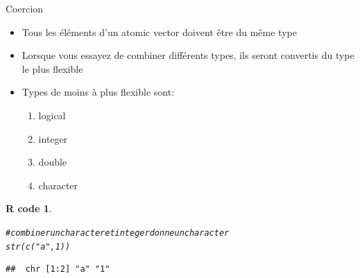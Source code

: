 \documentclass[11pt]{beamer}\usepackage[]{graphicx}\usepackage[]{color}
\makeatletter
\newcommand{\hlnum}[1]{\textcolor[rgb]{0.063,0.58,0.627}{#1}}%
\newcommand{\hlstr}[1]{\textcolor[rgb]{0.063,0.58,0.627}{#1}}%
\newcommand{\hlcom}[1]{\textcolor[rgb]{0.588,0.588,0.588}{#1}}%
\newcommand{\hlstd}[1]{\textcolor[rgb]{0.196,0.196,0.196}{#1}}%
\newcommand{\hlkwb}[1]{\textcolor[rgb]{0.627,0,0.314}{#1}}%
\newcommand{\hlkwd}[1]{\textcolor[rgb]{0.78,0.227,0.412}{#1}}%
\newenvironment{kframe}{%
 \def\at@end@of@kframe{}%
 \ifinner\ifhmode%
  \def\at@end@of@kframe{\end{minipage}}%
  \begin{minipage}{\columnwidth}%
 \fi\fi%
 \def\FrameCommand##1{\hskip\@totalleftmargin \hskip-\fboxsep
 \colorbox{shadecolor}{##1}\hskip-\fboxsep
     \hskip-\linewidth \hskip-\@totalleftmargin \hskip\columnwidth}%
 \MakeFramed {\advance\hsize-\width
   \@totalleftmargin\z@ \linewidth\hsize
   \@setminipage}}%
 {\par\unskip\endMakeFramed%
 \at@end@of@kframe}
\newenvironment{knitrout}{}{} %
\newtheorem{rcode}{R code}[section]
\makeatother
\begin{document}

\begin{frame}[fragile]{Coercion}

\begin{itemize}
  \setlength\itemsep{1em}
\item Tous les éléments d'un atomic vector doivent être du même type
\pause \item Lorsque vous essayez de combiner différents types, ils seront convertis du type le plus flexible
\pause \item Types de moins à plus flexible sont:
\begin{enumerate}
\item logical 
\item integer 
\item double 
\item character
\end{enumerate}
\end{itemize}
\begin{knitrout}
\color{fgcolor}\begin{kframe}
\begin{rcode}\label{unnamed-chunk-16}\begin{alltt}
\hlcom{# combiner un character et integer donne un character}
\hlkwd{str}\hlstd{(}\hlkwd{c}\hlstd{(}\hlstr{"a"}\hlstd{,} \hlnum{1}\hlstd{))}
\end{alltt}
\begin{verbatim}
##  chr [1:2] "a" "1"
\end{verbatim}
\end{rcode}\end{kframe}
\end{knitrout}
\end{frame}
\end{document}
